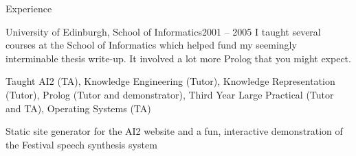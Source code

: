 \documentclass{resume} %
\begin{document}
\begin{rSection}{Experience}
\begin{rSubsection}{University of Edinburgh, School of Informatics}{2001 -- 2005}
{I taught several courses at the School of Informatics which helped fund my seemingly interminable thesis write-up. It involved a lot more Prolog that you might expect.}{}
\item Taught AI2 (TA), Knowledge Engineering (Tutor), Knowledge Representation (Tutor), Prolog (Tutor and demonstrator), Third Year Large Practical (Tutor and TA), Operating Systems (TA)
\item Static site generator for the AI2 website and a fun, interactive demonstration of the Festival speech synthesis system
\end{rSubsection}

\end{rSection}


\end{document}
